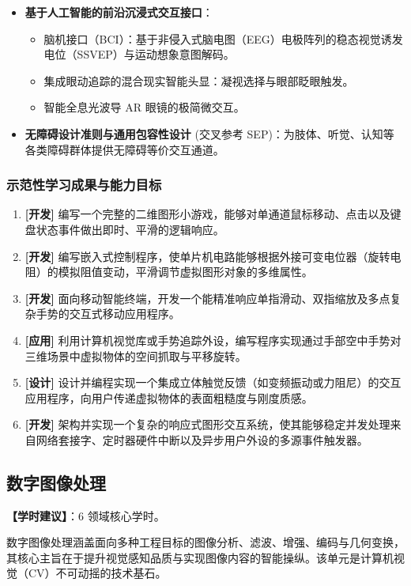 \begin{itemize}
    \item \textbf{基于人工智能的前沿沉浸式交互接口}：
    \begin{itemize}
        \item 脑机接口（BCI）：基于非侵入式脑电图（EEG）电极阵列的稳态视觉诱发电位（SSVEP）与运动想象意图解码。
        \item 集成眼动追踪的混合现实智能头显：凝视选择与眼部眨眼触发。
        \item 智能全息光波导 AR 眼镜的极简微交互。
    \end{itemize}
    \item \textbf{无障碍设计准则与通用包容性设计} (交叉参考 SEP)：为肢体、听觉、认知等各类障碍群体提供无障碍等价交互通道。
\end{itemize}

\subsubsection{示范性学习成果与能力目标}
\begin{enumerate}
    \item \textbf{[开发]} 编写一个完整的二维图形小游戏，能够对单通道鼠标移动、点击以及键盘状态事件做出即时、平滑的逻辑响应。
    \item \textbf{[开发]} 编写嵌入式控制程序，使单片机电路能够根据外接可变电位器（旋转电阻）的模拟阻值变动，平滑调节虚拟图形对象的多维属性。
    \item \textbf{[开发]} 面向移动智能终端，开发一个能精准响应单指滑动、双指缩放及多点复杂手势的交互式移动应用程序。
    \item \textbf{[应用]} 利用计算机视觉库或手势追踪外设，编写程序实现通过手部空中手势对三维场景中虚拟物体的空间抓取与平移旋转。
    \item \textbf{[设计]} 设计并编程实现一个集成立体触觉反馈（如变频振动或力阻尼）的交互应用程序，向用户传递虚拟物体的表面粗糙度与刚度质感。
    \item \textbf{[开发]} 架构并实现一个复杂的响应式图形交互系统，使其能够稳定并发处理来自网络套接字、定时器硬件中断以及异步用户外设的多源事件触发器。
\end{enumerate}

\subsection{数字图像处理}
\textbf{【学时建议】}：6 领域核心学时。

数字图像处理涵盖面向多种工程目标的图像分析、滤波、增强、编码与几何变换，其核心主旨在于提升视觉感知品质与实现图像内容的智能操纵。该单元是计算机视觉（CV）不可动摇的技术基石。

